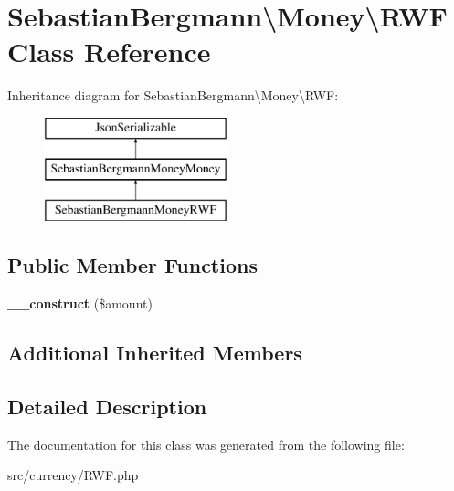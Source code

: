 \hypertarget{classSebastianBergmann_1_1Money_1_1RWF}{}\section{Sebastian\+Bergmann\textbackslash{}Money\textbackslash{}R\+W\+F Class Reference}
\label{classSebastianBergmann_1_1Money_1_1RWF}
Inheritance diagram for Sebastian\+Bergmann\textbackslash{}Money\textbackslash{}R\+W\+F\+:\begin{figure}[H]
\begin{center}
\leavevmode
\includegraphics[height=3.000000cm]{classSebastianBergmann_1_1Money_1_1RWF}
\end{center}
\end{figure}
\subsection*{Public Member Functions}
\begin{DoxyCompactItemize}
\item 
\hypertarget{classSebastianBergmann_1_1Money_1_1RWF_abaaffe41f39899afe84ab69d695e987c}{}{\bfseries \+\_\+\+\_\+construct} (\$amount)\label{classSebastianBergmann_1_1Money_1_1RWF_abaaffe41f39899afe84ab69d695e987c}

\end{DoxyCompactItemize}
\subsection*{Additional Inherited Members}


\subsection{Detailed Description}


The documentation for this class was generated from the following file\+:\begin{DoxyCompactItemize}
\item 
src/currency/R\+W\+F.\+php\end{DoxyCompactItemize}
